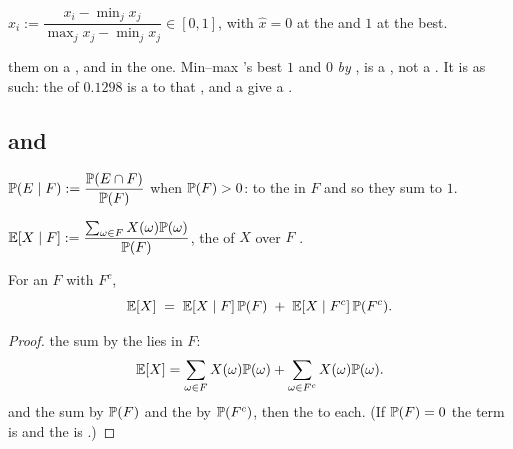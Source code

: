\begin{definition}
$\hat x_i := \dfrac{x_i - \min_j x_j}{\max_j x_j - \min_j x_j} \in [0,1]$,
with $\hat x = 0$ at the   and $1$ at the best.
\end{definition}

   
   them on a  , and  in the 
 one. Min--max   's best   $1$ and  
$0$ \emph{by },  is a , not a . It is
 as such: the   of $0.1298$ is a   to that
, and a     give a  .

\subsection{  and  }

\begin{definition}
$\mathbb{P}(E\mid F) := \dfrac{\mathbb{P}(E\cap F)}{\mathbb{P}(F)}$ when $\mathbb{P}(F)>0$:
  to the  in $F$ and  so they sum to $1$.
\end{definition}

\begin{definition}
$\mathbb{E}[X \mid F] := \dfrac{\sum_{\omega\in F} X(\omega)\mathbb{P}(\omega)}{\mathbb{P}(F)}$,
the  of $X$ over $F$ .
\end{definition}

\begin{lemma}
\label{lem:tower}
For an  $F$ with  $F^c$,
\[
\mathbb{E}[X] \;=\; \mathbb{E}[X\mid F]\,\mathbb{P}(F) \;+\; \mathbb{E}[X\mid F^c]\,\mathbb{P}(F^c).
\]
\end{lemma}
\begin{proof}
 the  sum by  the  lies in $F$:
\[
\mathbb{E}[X]=\sum_{\omega\in F}X(\omega)\mathbb{P}(\omega)+\sum_{\omega\in F^c}X(\omega)\mathbb{P}(\omega).
\]
 and  the  sum by $\mathbb{P}(F)$ and the  by $\mathbb{P}(F^c)$,
then  the   to each. (If $\mathbb{P}(F)=0$ the term is  and
the  is .)
\end{proof}

